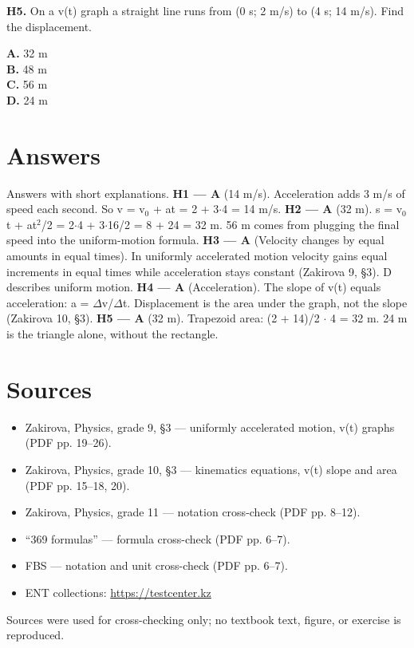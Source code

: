 \documentclass[11pt]{article}
\begin{document}
\textbf{H5.} On a v(t) graph a straight line runs from (0 s; 2 m/s) to (4 s; 14 m/s). Find the displacement.

\textbf{A.} 32 m \\
\textbf{B.} 48 m \\
\textbf{C.} 56 m \\
\textbf{D.} 24 m
\clearpage
\section*{Answers}
Answers with short explanations.
\textbf{H1 — A} (14 m/s). Acceleration adds 3 m/s of speed each second. So v = v$_0$ + at = 2 + 3$\cdot$4 = 14 m/s.
\textbf{H2 — A} (32 m). s = v$_0$t + at$^2$/2 = 2$\cdot$4 + 3$\cdot$16/2 = 8 + 24 = 32 m. 56 m comes from plugging the final speed into the uniform-motion formula.
\textbf{H3 — A} (Velocity changes by equal amounts in equal times). In uniformly accelerated motion velocity gains equal increments in equal times while acceleration stays constant (Zakirova 9, §3). D describes uniform motion.
\textbf{H4 — A} (Acceleration). The slope of v(t) equals acceleration: a = $\Delta$v/$\Delta$t. Displacement is the area under the graph, not the slope (Zakirova 10, §3).
\textbf{H5 — A} (32 m). Trapezoid area: (2 + 14)/2 $\cdot$ 4 = 32 m. 24 m is the triangle alone, without the rectangle.
\section*{Sources}
\begin{itemize}
\item Zakirova, Physics, grade 9, §3 — uniformly accelerated motion, v(t) graphs (PDF pp. 19–26).
\item Zakirova, Physics, grade 10, §3 — kinematics equations, v(t) slope and area (PDF pp. 15–18, 20).
\item Zakirova, Physics, grade 11 — notation cross-check (PDF pp. 8–12).
\item “369 formulas” — formula cross-check (PDF pp. 6–7).
\item FBS — notation and unit cross-check (PDF pp. 6–7).
\item ENT collections: \url{https://testcenter.kz}
\end{itemize}
Sources were used for cross-checking only; no textbook text, figure, or exercise is reproduced.
\end{document}
